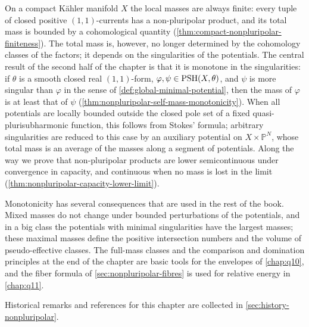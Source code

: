 On a compact K\"ahler manifold $X$ the local masses are always finite: every tuple of closed positive $(1,1)$-currents has a non-pluripolar product, and its total mass is bounded by a cohomological quantity (\cref{thm:compact-nonpluripolar-finiteness}). The total mass is, however, no longer determined by the cohomology classes of the factors; it depends on the singularities of the potentials. The central result of the second half of the chapter is that it is monotone in the singularities: if $\theta$ is a smooth closed real $(1,1)$-form, $\varphi,\psi\in\mathrm{PSH}(X,\theta)$, and $\psi$ is more singular than $\varphi$ in the sense of \cref{def:global-minimal-potential}, then the mass of $\varphi$ is at least that of $\psi$ (\cref{thm:nonpluripolar-self-mass-monotonicity}). When all potentials are locally bounded outside the closed pole set of a fixed quasi-plurisubharmonic function, this follows from Stokes' formula; arbitrary singularities are reduced to this case by an auxiliary potential on $X\times\mathbb P^N$, whose total mass is an average of the masses along a segment of potentials. Along the way we prove that non-pluripolar products are lower semicontinuous under convergence in capacity, and continuous when no mass is lost in the limit (\cref{thm:nonpluripolar-capacity-lower-limit}).

Monotonicity has several consequences that are used in the rest of the book. Mixed masses do not change under bounded perturbations of the potentials, and in a big class the potentials with minimal singularities have the largest masses; these maximal masses define the positive intersection numbers and the volume of pseudo-effective classes. The full-mass classes and the comparison and domination principles at the end of the chapter are basic tools for the envelopes of \cref{chap:q10}, and the fiber formula of \cref{sec:nonpluripolar-fibres} is used for relative energy in \cref{chap:q11}.

Historical remarks and references for this chapter are collected in \cref{sec:history-nonpluripolar}.

